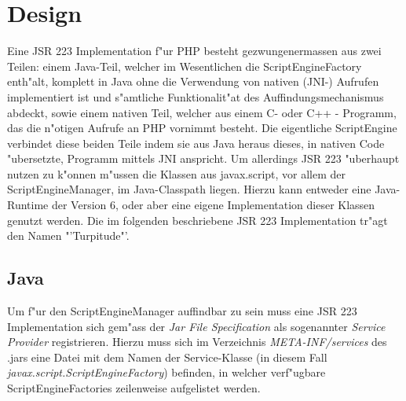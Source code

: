 \section{Design}
\label{sec:chap1:design}

Eine JSR 223 Implementation f"ur PHP besteht gezwungenermassen aus zwei Teilen: einem Java-Teil, welcher im Wesentlichen
die ScriptEngineFactory enth"alt, komplett in Java ohne die Verwendung von nativen (JNI-) Aufrufen implementiert ist und
s"amtliche Funktionalit"at des Auffindungsmechanismus abdeckt, sowie einem nativen Teil, welcher aus 
einem C- oder C++ - Programm, das die n"otigen Aufrufe an PHP vornimmt besteht.
Die eigentliche ScriptEngine verbindet diese beiden Teile indem sie aus Java heraus dieses, in nativen Code "ubersetzte, 
Programm mittels JNI anspricht.
Um allerdings JSR 223 "uberhaupt nutzen zu k"onnen m"ussen die Klassen aus javax.script, vor allem der ScriptEngineManager, 
im Java-Classpath liegen. Hierzu kann entweder eine Java-Runtime der Version 6, oder aber eine eigene Implementation dieser
Klassen genutzt werden. 
Die im folgenden beschriebene JSR 223 Implementation tr"agt den Namen "'Turpitude"'.

\subsection{Java}
\label{sec:chap1:design:java}

Um f"ur den ScriptEngineManager auffindbar zu sein muss eine JSR 223 Implementation sich gem"ass der \emph{Jar File Specification} \cite{JARSPEC} 
als sogenannter \emph{Service Provider} registrieren. Hierzu muss sich im Verzeichnis \emph{META-INF/services} des .jars eine Datei
mit dem Namen der Service-Klasse (in diesem Fall \emph{javax.script.ScriptEngineFactory}) befinden, in welcher verf"ugbare 
ScriptEngineFactories zeilenweise aufgelistet werden.


